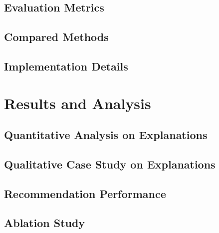 \subsection{Evaluation Metrics}


\subsection{Compared Methods}


\subsection{Implementation Details}





\section{Results and Analysis}

\subsection{Quantitative Analysis on Explanations}


\subsection{Qualitative Case Study on Explanations}


\subsection{Recommendation Performance}


\subsection{Ablation Study}

